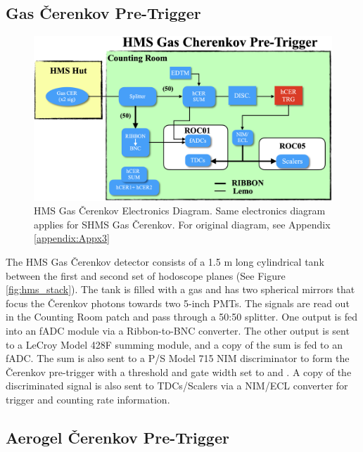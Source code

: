 \documentclass[11pt]{article}
\begin{document}
\subsection{Gas \v{C}erenkov Pre-Trigger} \label{hms_cer_section}
\begin{figure}[h!]
  \centering
  \includegraphics[scale=0.35]{images/hCER_diagram.png}
  \caption{HMS Gas \v{C}erenkov Electronics Diagram. Same electronics diagram applies for SHMS Gas \v{C}erenkov. For original diagram, see Appendix \ref{appendix:Appx3} }
  \label{fig:hCER_diagram}
\end{figure}

\indent The HMS Gas \v{C}erenkov detector consists of a 1.5 m long cylindrical tank between the first and second set of hodoscope planes (See Figure \ref{fig:hms_stack}).
The tank is filled with a gas and has two spherical mirrors that focus the \v{C}erenkov photons towards two 5-inch PMTs\cite{hms_cer_article}. The
signals are read out in the Counting Room patch and pass through a 50:50 splitter. One output is fed into
an fADC module via a Ribbon-to-BNC converter. The other output is sent to a LeCroy Model 428F summing module, and a copy of the sum is fed to an fADC. The sum is
also sent to a P/S Model 715 NIM discriminator to form the \v{C}erenkov pre-trigger with a threshold and gate width set to \hcerthrs and \hcergate. A copy of the discriminated signal is also sent to TDCs/Scalers via a NIM/ECL converter for trigger and counting rate information.


\subsection{Aerogel \v{C}erenkov Pre-Trigger}
\end{document}

